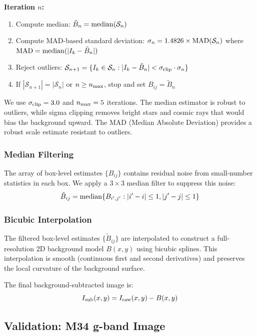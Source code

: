 \documentclass[linenumbers,trackchanges,twocolumn]{aastex701}
\begin{document}
\textbf{Iteration $n$:}
\begin{enumerate}
\item Compute median: $\tilde{B}_n = {\rm median}(\mathcal{S}_n)$
\item Compute MAD-based standard deviation: $\sigma_n = 1.4826 \times {\rm MAD}(\mathcal{S}_n)$ where ${\rm MAD} = {\rm median}(|I_k - \tilde{B}_n|)$
\item Reject outliers: $\mathcal{S}_{n+1} = \{I_k \in \mathcal{S}_n : |I_k - \tilde{B}_n| < \sigma_{\rm clip} \cdot \sigma_n\}$
\item If $|\mathcal{S}_{n+1}| = |\mathcal{S}_n|$ or $n \geq n_{\rm max}$, stop and set $B_{ij} = \tilde{B}_n$
\end{enumerate}

We use $\sigma_{\rm clip} = 3.0$ and $n_{\rm max} = 5$ iterations. The median estimator is robust to outliers, while sigma clipping removes bright stars and cosmic rays that would bias the background upward. The MAD (Median Absolute Deviation) provides a robust scale estimate resistant to outliers.

\subsubsection{Median Filtering}

The array of box-level estimates $\{B_{ij}\}$ contains residual noise from small-number statistics in each box. We apply a $3 \times 3$ median filter to suppress this noise:
\begin{equation}
\tilde{B}_{ij} = {\rm median}\{B_{i',j'} : |i' - i| \leq 1, |j' - j| \leq 1\}
\end{equation}

\subsubsection{Bicubic Interpolation}

The filtered box-level estimates $\{\tilde{B}_{ij}\}$ are interpolated to construct a full-resolution 2D background model $B(x,y)$ using bicubic splines. This interpolation is smooth (continuous first and second derivatives) and preserves the local curvature of the background surface.

The final background-subtracted image is:
\begin{equation}
I_{\rm sub}(x,y) = I_{\rm raw}(x,y) - B(x,y)
\end{equation}

\subsection{Validation: M34 g-band Image}
\end{document}
